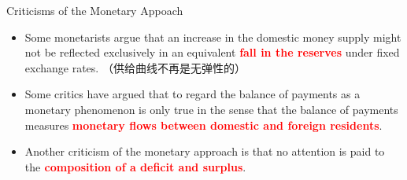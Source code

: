 \documentclass[10pt,hyperref={CJKbookmarks=true},xcolor=dvipsnames,aspectratio=169]{beamer}
\begin{document}
\begin{frame}{Criticisms of the Monetary Appoach}

\begin{itemize}
\item Some monetarists argue that an increase in the domestic money supply
might not be reflected exclusively in an equivalent \textbf{\textcolor{red}{fall
in the reserves}} under fixed exchange rates. （供给曲线不再是无弹性的）
\item Some critics have argued that to regard the balance of payments as
a monetary phenomenon is only true in the sense that the balance of
payments measures \textbf{\textcolor{red}{monetary flows between domestic
and foreign residents}}. 
\item Another criticism of the monetary approach is that no attention is
paid to the\textbf{\textcolor{red}{{} composition of a deficit and surplus}}. 
\end{itemize}

\end{frame}
\end{document}
